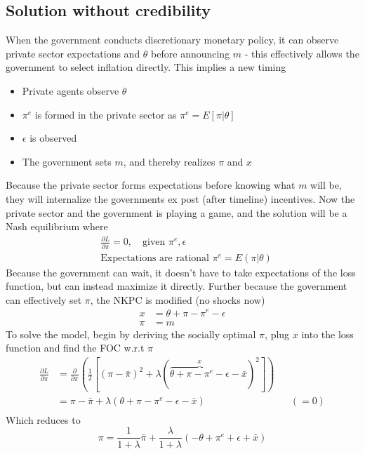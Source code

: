 \documentclass[12pt, a4paper]{article}
\begin{document}
\begin{spacing}{1.213}
\subsection{Solution without credibility}
When the government conducts discretionary monetary policy, it can observe private sector expectations and $\theta$ before announcing $m$ - this effectively allows the government to select inflation directly. This implies a new timing 
\begin{itemize}
\item Private agents observe $\theta$
\item $\pi^e$ is formed in the private sector as $\pi^e = E[\pi|\theta]$
\item $\epsilon$ is observed 
\item The government sets $m$, and thereby realizes $\pi$ and $x$
\end{itemize}
Because the private sector forms expectations before knowing what $m$ will be, they will internalize the governments ex post (after timeline) incentives. Now the private sector and the government is playing a game, and the solution will be a Nash equilibrium where
\begin{align}
&\frac{\partial L}{\partial \pi} = 0, \quad \textrm{given } \pi^e, \epsilon \\
& \textrm{Expectations are rational } \pi^e = E(\pi|\theta)
\end{align}
Because the government can wait, it doesn't have to take expectations of the loss function, but can instead maximize it directly. Further because the government can effectively set $\pi$, the NKPC is modified (no shocks now)
\begin{align*}
x&= \theta + \pi - \pi^e - \epsilon \\
\pi &= m
\end{align*}
To solve the model, begin by deriving the socially optimal $\pi$, plug $x$ into the loss function and find the FOC w.r.t $\pi$ 
\begin{align*}
\frac{\partial L}{\partial \pi} &= \frac{\partial }{\partial \pi} \left(  \frac{1}{2}[(\pi - \bar{\pi})^2 + \lambda(\overbrace{\theta + \pi - \pi^e - \epsilon}^{x} - \bar{x})^2 ] \right) \\
& = \pi - \bar{\pi} + \lambda(\theta + \pi - \pi^e - \epsilon - \bar{x}) && (=0) \\
\end{align*}
Which reduces to 
\begin{equation} \label{eq: optuncredpi}
\pi = \frac{1}{1+ \lambda} \bar{\pi} + \frac{\lambda}{1+ \lambda}(- \theta + \pi^e + \epsilon + \bar{x})

\end{equation}
\end{spacing}
\end{document}
